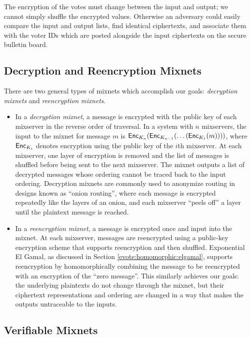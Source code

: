 The encryption of the votes must change between the input and output; we cannot simply shuffle the encrypted values. Otherwise an adversary could easily compare the input and output lists, find identical ciphertexts, and associate them with the voter IDs which are posted alongside the input ciphertexts on the secure bulletin board.

\subsection{Decryption and Reencryption Mixnets} \label{evote:mixnets:types}

There are two general types of mixnets which accomplish our goals: \emph{decryption mixnets} and \emph{reencryption mixnets}.
\begin{itemize}
\item In a \emph{decryption mixnet}, a message is encrypted with the public key of each mixserver in the reverse order of traversal. In a system with $n$ mixservers, the input to the mixnet for message $m$ is $\operatorname{\mathsf{Enc}}_{K_n}(\operatorname{\mathsf{Enc}}_{K_{n-1}}( \dots (\operatorname{\mathsf{Enc}}_{K_1}(m))))$, where $\operatorname{\mathsf{Enc}}_{K_i}$ denotes encryption using the public key of the $i$th mixserver. At each mixserver, one layer of encryption is removed and the list of messages is shuffled before being sent to the next mixserver. The mixnet outputs a list of decrypted messages whose ordering cannot be traced back to the input ordering. Decryption mixnets are commonly used to anonymize routing in designs known as ``onion routing'', where each message is encrypted repeatedly like the layers of an onion, and each mixserver ``peels off'' a layer until the plaintext message is reached.
\item In a \emph{reencryption mixnet}, a message is encrypted once and input into the mixnet. At each mixserver, messages are reencrypted using a public-key encryption scheme that supports reencryption and then shuffled. Exponential El Gamal, as discussed in Section \ref{evote:homomorphic:elgamal}, supports reencryption by homomorphically combining the message to be reencrypted with an encryption of the ``zero message''. This similarly achieves our goals: the underlying plaintexts do not change through the mixnet, but their ciphertext representations and ordering are changed in a way that makes the outputs untraceable to the inputs.
\end{itemize}

\subsection{Verifiable Mixnets} \label{evote:mixnets:verifiable}

